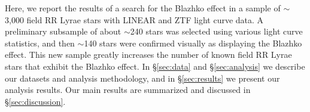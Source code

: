 Here, we report the results of a search for the Blazhko effect in a sample of $\sim$3,000 field RR Lyrae stars with
LINEAR and ZTF light curve data. A preliminary subsample of about $\sim$240 stars was selected using various
light curve statistics, and then $\sim$140 stars were confirmed visually as displaying the Blazhko effect. This new
sample greatly increases the number of known field RR Lyrae stars that exhibit the Blazhko effect. In \S\ref{sec:data}
and \S\ref{sec:analysis} we describe our datasets and analysis methodology, and in \S\ref{sec:results} we present our analysis results. 
Our main results are summarized and discussed in \S\ref{sec:discussion}.
